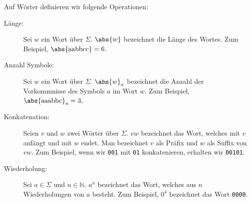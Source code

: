 %
%
Auf Wörter definieren wir folgende Operationen:
\begin{description}
    \item[Länge:] Sei \(w\) ein Wort über \(\Sigma\). \(\abs{w}\) bezeichnet die Länge des Wortes. Zum Beispiel, \(\abs{\text{aabbcc}}=6\).
    \item[Anzahl Symbole:] Sei \(w\) ein Wort über \(\Sigma\). \(\abs{w}_a\) bezeichnet die Anzahl der Vorkommnisse des Symbols \(a\) im Wort \(w\). Zum Beispiel, \(\abs{\text{aaabbc}}_a=3\).
    \item[Konkatenation:] Seien \(v\) und \(w\) zwei Wörter über \(\Sigma\). \(vw\) bezeichnet das Wort, welches mit \(v\) anfängt und mit \(w\) endet. Man bezeichnet \(v\) als Präfix und \(w\) als Suffix von \(vw\). Zum Beispiel, wenn wir \texttt{001} mit \texttt{01} konkatenieren, erhalten wir \texttt{00101}.
    \item[Wiederholung:] Sei \(a \in \Sigma\) und \(n \in \mathbb{N}\). \(a^n\) bezeichnet das Wort, welches aus \(n\) Wiederholungen von \(a\) besteht. Zum Beispiel, \(\text{0}^4\) bezeichnet das Wort \texttt{0000}.
\end{description}
